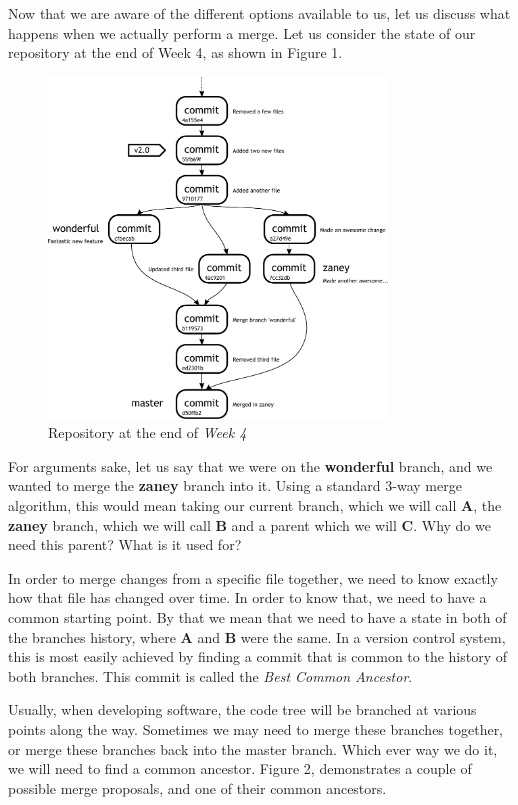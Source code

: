 Now that we are aware of the different options available to us, let us discuss what happens when we actually perform a merge.
Let us consider the state of our repository at the end of Week 4, as shown in Figure 1.

\begin{figure}[hbt]
\centering
\includegraphics[width=9cm]{images/f-w4-d6.pdf}
\caption{Repository at the end of \emph{Week 4}}
\end{figure}

For arguments sake, let us say that we were on the \textbf{wonderful} branch, and we wanted to merge the \textbf{zaney} branch into it.
Using a standard 3-way merge algorithm, this would mean taking our current branch, which we will call \textbf{A}, the \textbf{zaney} branch, which we will call \textbf{B} and a parent which we will \textbf{C}.
Why do we need this parent? What is it used for?

In order to merge changes from a specific file together, we need to know exactly how that file has changed over time.
In order to know that, we need to have a common starting point.
By that we mean that we need to have a state in both of the branches history, where \textbf{A} and \textbf{B} were the same.
In a version control system, this is most easily achieved by finding a commit that is common to the history of both branches.
This commit is called the \emph{Best Common Ancestor}.

Usually, when developing software, the code tree will be branched at various points along the way.
Sometimes we may need to merge these branches together, or merge these branches back into the master branch.
Which ever way we do it, we will need to find a common ancestor.
Figure 2, demonstrates a couple of possible merge proposals, and one of their common ancestors.

